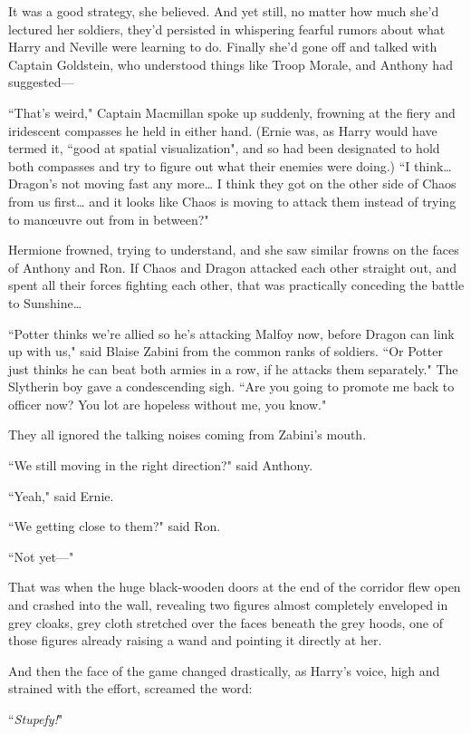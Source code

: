 It was a good strategy, she believed. And yet still, no matter how much she'd lectured her soldiers, they'd persisted in whispering fearful rumors about what Harry and Neville were learning to do. Finally she'd gone off and talked with Captain Goldstein, who understood things like Troop Morale, and Anthony had suggested—

``That's weird," Captain Macmillan spoke up suddenly, frowning at the fiery and iridescent compasses he held in either hand. (Ernie was, as Harry would have termed it, ``good at spatial visualization", and so had been designated to hold both compasses and try to figure out what their enemies were doing.) ``I think{\ldots} Dragon's not moving fast any more{\ldots} I think they got on the other side of Chaos from us first{\ldots} and it looks like Chaos is moving to attack them instead of trying to manœuvre out from in between?"

Hermione frowned, trying to understand, and she saw similar frowns on the faces of Anthony and Ron. If Chaos and Dragon attacked each other straight out, and spent all their forces fighting each other, that was practically conceding the battle to Sunshine{\ldots}

``Potter thinks we're allied so he's attacking Malfoy now, before Dragon can link up with us," said Blaise Zabini from the common ranks of soldiers. ``Or Potter just thinks he can beat both armies in a row, if he attacks them separately." The Slytherin boy gave a condescending sigh. ``Are you going to promote me back to officer now? You lot are hopeless without me, you know."

They all ignored the talking noises coming from Zabini's mouth.

``We still moving in the right direction?" said Anthony.

``Yeah," said Ernie.

``We getting close to them?" said Ron.

``Not yet—"

That was when the huge black-wooden doors at the end of the corridor flew open and crashed into the wall, revealing two figures almost completely enveloped in grey cloaks, grey cloth stretched over the faces beneath the grey hoods, one of those figures already raising a wand and pointing it directly at her.

And then the face of the game changed drastically, as Harry's voice, high and strained with the effort, screamed the word:

``\emph{Stupefy!}"

